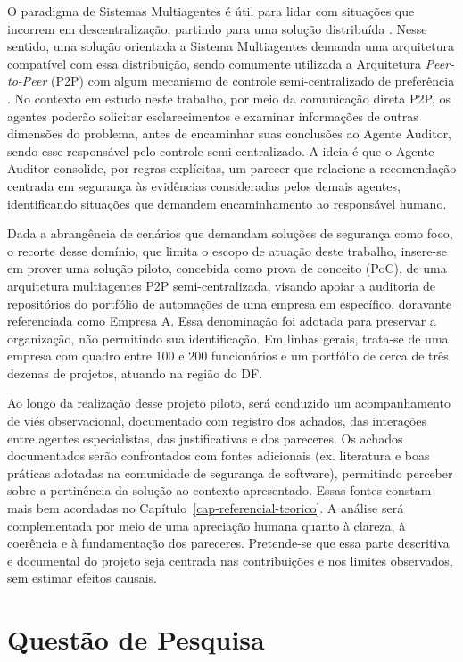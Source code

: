 O paradigma de Sistemas Multiagentes é útil para lidar com situações que incorrem em descentralização, partindo para uma solução distribuída \cite{wang2026}. Nesse sentido, uma solução orientada a Sistema Multiagentes demanda uma arquitetura compatível com essa distribuição, sendo comumente utilizada a Arquitetura \textit{Peer-to-Peer} (P2P) com algum mecanismo de controle semi-centralizado de preferência \cite{moro2003,flores2005}. No contexto em estudo neste trabalho, por meio da comunicação direta P2P, os agentes poderão solicitar esclarecimentos e examinar informações de outras dimensões do problema, antes de encaminhar suas conclusões ao Agente Auditor, sendo esse responsável pelo controle semi-centralizado. A ideia é que o Agente Auditor consolide, por regras explícitas, um parecer que relacione a recomendação centrada em segurança às evidências consideradas pelos demais agentes, identificando situações que demandem encaminhamento ao responsável humano. 

Dada a abrangência de cenários que demandam soluções de segurança como foco, o recorte desse domínio, que limita o escopo de atuação deste trabalho, insere-se em prover uma solução piloto, concebida como prova de conceito (PoC), de uma arquitetura multiagentes P2P semi-centralizada, visando apoiar a auditoria de repositórios do portfólio de automações de uma empresa em específico, doravante referenciada como Empresa A. Essa denominação foi adotada para preservar a organização, não permitindo sua identificação. Em linhas gerais, trata-se de uma empresa com quadro entre 100 e 200 funcionários e um portfólio de cerca de três dezenas de projetos, atuando na região do DF.

Ao longo da realização desse projeto piloto, será conduzido um acompanhamento de viés observacional, documentado com registro dos achados, das interações entre agentes especialistas, das justificativas e dos pareceres. Os achados documentados serão confrontados com fontes adicionais (ex. literatura e boas práticas adotadas na comunidade de segurança de software), permitindo perceber sobre a pertinência da solução ao contexto apresentado. Essas fontes constam mais bem acordadas no Capítulo~\ref{cap-referencial-teorico}. A análise será complementada por meio de uma apreciação humana quanto à clareza, à coerência e à fundamentação dos pareceres. Pretende-se que essa parte descritiva e documental do projeto seja centrada nas contribuições e nos limites observados, sem estimar efeitos causais.

\section{Questão de Pesquisa}
\label{1-questao}

